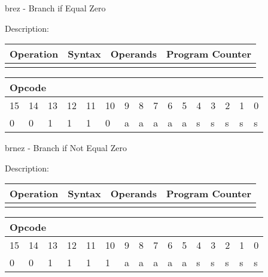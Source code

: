\documentclass{article}
\begin{document}
\bigskip

brez - Branch if Equal Zero

Description:

\begin{tabular}{|l|l|l|l|}
\hline
Operation & Syntax & Operands & Program Counter \\ \hline
&  &  &  \\ \hline
\end{tabular}

\begin{tabular}{|c|c|c|c|c|c|c|c|c|c|c|c|c|c|c|c|}
\hline
\multicolumn{6}{|l|}{Opcode} & \multicolumn{5}{|l|}{} & \multicolumn{5}{|l|}{
} \\ \hline
15 & 14 & 13 & 12 & 11 & 10 & 9 & 8 & 7 & 6 & 5 & 4 & 3 & 2 & 1 & 0 \\ \hline
\multicolumn{1}{|l|}{0} & \multicolumn{1}{|l|}{0} & \multicolumn{1}{|l|}{1}
& \multicolumn{1}{|l|}{1} & \multicolumn{1}{|l|}{1} & \multicolumn{1}{|l|}{0}
& \multicolumn{1}{|l|}{a} & \multicolumn{1}{|l|}{a} & \multicolumn{1}{|l|}{a}
& \multicolumn{1}{|l|}{a} & \multicolumn{1}{|l|}{a} & \multicolumn{1}{|l|}{s}
& \multicolumn{1}{|l|}{s} & \multicolumn{1}{|l|}{s} & \multicolumn{1}{|l|}{s}
& \multicolumn{1}{|l|}{s} \\ \hline
\end{tabular}

\bigskip

brnez - Branch if Not Equal Zero

Description:

\begin{tabular}{|l|l|l|l|}
\hline
Operation & Syntax & Operands & Program Counter \\ \hline
&  &  &  \\ \hline
\end{tabular}

\begin{tabular}{|c|c|c|c|c|c|c|c|c|c|c|c|c|c|c|c|}
\hline
\multicolumn{6}{|l|}{Opcode} & \multicolumn{5}{|l|}{} & \multicolumn{5}{|l|}{
} \\ \hline
15 & 14 & 13 & 12 & 11 & 10 & 9 & 8 & 7 & 6 & 5 & 4 & 3 & 2 & 1 & 0 \\ \hline
\multicolumn{1}{|l|}{0} & \multicolumn{1}{|l|}{0} & \multicolumn{1}{|l|}{1}
& \multicolumn{1}{|l|}{1} & \multicolumn{1}{|l|}{1} & \multicolumn{1}{|l|}{1}
& \multicolumn{1}{|l|}{a} & \multicolumn{1}{|l|}{a} & \multicolumn{1}{|l|}{a}
& \multicolumn{1}{|l|}{a} & \multicolumn{1}{|l|}{a} & \multicolumn{1}{|l|}{s}
& \multicolumn{1}{|l|}{s} & \multicolumn{1}{|l|}{s} & \multicolumn{1}{|l|}{s}
& \multicolumn{1}{|l|}{s} \\ \hline
\end{tabular}
\end{document}
